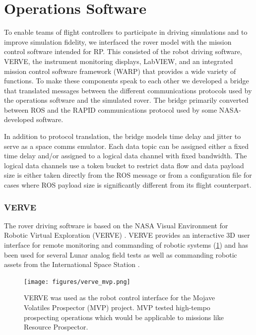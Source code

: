 \documentclass[twocolumn,letterpaper]{IEEEAerospaceCLS}  %
\begin{document}
\section{Operations Software}
\label{sec:ops-software}

To enable teams of flight controllers to participate in driving simulations and to improve simulation fidelity, we interfaced the rover model with the mission control software intended for RP.  
This consisted of the robot driving software, VERVE, the instrument monitoring displays, LabVIEW, and an integrated mission control software framework (WARP) that provides a wide variety of functions.  
To make these components speak to each other we developed a bridge that translated messages between the different communications protocols used by the operations software and the simulated rover. 
The bridge primarily converted between ROS and the RAPID communications protocol\cite{torres2009rapid} used by some NASA-developed software. 

In addition to protocol translation, the bridge models time delay and jitter to serve as a space comms emulator. 
Each data topic can be assigned either a fixed time delay and/or assigned to a logical data channel with fixed bandwidth. 
The logical data channels use a token bucket to restrict data flow and data payload size is either taken directly from the ROS message or from a configuration file for cases where ROS payload size is significantly different from its flight counterpart. 

\subsubsection{VERVE}

The rover driving software is based on the NASA Visual Environment for Robotic Virtual Exploration (VERVE) \cite{lee2013reusable}. VERVE provides an interactive 3D user interface for remote monitoring and commanding of robotic systems (\cref{fig:verve-mvp}) and has been used for several Lunar analog field tests \cite{deans2009robotic} \cite{fong2010robotic} as well as commanding robotic assets from the International Space Station \cite{bualat2013surface}.

\begin{figure}[htp]
\centering
\texttt{[image: figures/verve\_mvp.png]}
\caption{VERVE was used as the robot control interface for the Mojave Volatiles Prospector (MVP) project.  MVP tested high-tempo prospecting operations which would be applicable to missions like Resource Prospector.\label{fig:verve-mvp}}
\end{figure}
\end{document}
